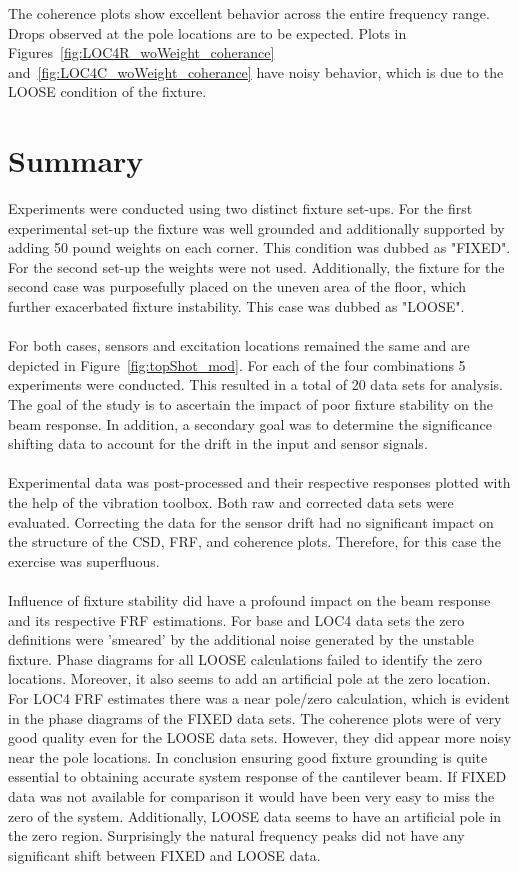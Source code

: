 \documentclass[paper=a4, fontsize=12pt]{scrartcl} %
\begin{document}
%
The coherence plots show excellent behavior across the entire frequency range. Drops observed at the pole locations are to be expected. Plots in Figures~\ref{fig:LOC4R_woWeight_coherance} and~\ref{fig:LOC4C_woWeight_coherance} have noisy behavior, which is due to the LOOSE condition of the fixture.
%
%
\section*{Summary}
%
Experiments were conducted using two distinct fixture set-ups. For the first experimental set-up the fixture was well grounded and additionally supported by adding 50 pound weights on each corner. This condition was dubbed as "FIXED". For the second set-up the weights were not used. Additionally, the fixture for the second case was purposefully placed on the uneven area of the floor, which further exacerbated fixture instability. This case was dubbed as "LOOSE".  
\\
\\
For both cases, sensors and excitation locations remained the same and are depicted in Figure~\ref{fig:topShot_mod}. For each of the four combinations 5 experiments were conducted. This resulted in a total of 20 data sets for analysis. The goal of the study is to ascertain the impact of poor fixture stability on the beam response. In addition, a secondary goal was to determine the significance shifting data to account for the drift in the input and sensor signals.  
\\
\\
Experimental data was post-processed and their respective responses plotted with the help of the vibration toolbox. Both raw and corrected data sets were evaluated. Correcting the data for the sensor drift had no significant impact on the structure of the CSD, FRF, and coherence plots. Therefore, for this case the exercise was superfluous. 
\\
\\
Influence of fixture stability did have a profound impact on the beam response and its respective FRF estimations. For base and LOC4 data sets the zero definitions were 'smeared' by the additional noise generated by the unstable fixture. Phase diagrams for all LOOSE calculations failed to identify the zero locations. Moreover, it also seems to add an artificial pole at the zero location. For LOC4 FRF estimates there was a near pole/zero calculation, which is evident in the phase diagrams of the FIXED data sets. The coherence plots were of very good quality even for the LOOSE data sets. However, they did appear more noisy near the pole locations. In conclusion ensuring good fixture grounding is quite essential to obtaining accurate system response of the cantilever beam. If FIXED data was not available for comparison it would have been very easy to miss the zero of the system. Additionally, LOOSE data seems to have an artificial pole in the zero region. Surprisingly the natural frequency peaks did not have any significant shift between FIXED and LOOSE data.
\end{document}
